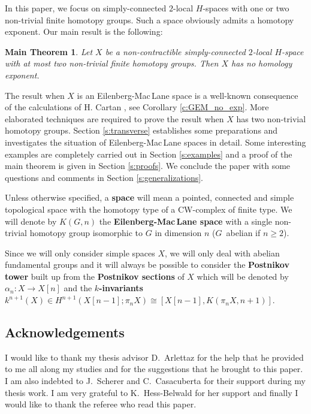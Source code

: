 \documentclass{conm-p-l}
\newtheorem*{mainthm*}{Main Theorem}
\theoremstyle{definition}
\renewcommand{\geq}{\geqslant}
\begin{document}
In this paper, we focus on simply-connected $2$-local ${H}$-spaces with one or two non-trivial finite homotopy groups. Such a space obviously admits a homotopy exponent. Our main result is the following:

\begin{mainthm*}
Let $X$ be a non-contractible simply-connected $2$-local ${H}$-space with at most two non-trivial finite homotopy groups. Then $X$ has no homology exponent.
\end{mainthm*}

The result when $X$ is an Eilenberg-Mac\,Lane space is a well-known consequence of the calculations of H. Cartan \cite{Ca55}, see Corollary \ref{c:GEM_no_exp}. More elaborated techniques are required to prove the result when $X$ has two non-trivial homotopy groups. Section \ref{s:transverse} establishes some preparations and investigates the situation of Eilenberg-Mac\,Lane spaces in detail. Some interesting examples are completely carried out in Section \ref{s:examples} and a proof of the main theorem is given in Section \ref{s:proofs}. We conclude the paper with some questions and comments in Section \ref{s:generalizations}.

Unless otherwise specified, a {\bf space} will mean a pointed, connected and simple topological space with the homotopy type of a CW-complex of finite type. We will denote by $K(G,n)$ the {\bf Eilenberg-Mac\,Lane space} with a single non-trivial homotopy group isomorphic to $G$ in dimension $n$ ($G$~abelian if $n\geq2$). 

Since we will only consider simple spaces $X$, we will only deal with abelian fundamental groups and it will always be possible to consider the {\bf Postnikov tower} built up from the {\bf Postnikov sections} of $X$ which will be denoted by $\alpha_n:X\longrightarrow X[n]$ and the {\bf $k$-invariants} $k^{n+1}(X)\in H^{n+1}(X[n-1];\pi_n X)\cong[X[n-1],K(\pi_n X,n+1)]$.

\subsection*{Acknowledgements}

I would like to thank my thesis advisor \hbox{D.~Arlettaz} for the help that he provided to me all along my studies and for the suggestions that he brought to this paper. I am also indebted to \hbox{J.~Scherer} and \hbox{C.~Casacuberta} for their support during my thesis work. I am very grateful to \hbox{K.~Hess-Belwald} for her support and finally I would like to thank the referee who read this paper.
\end{document}
